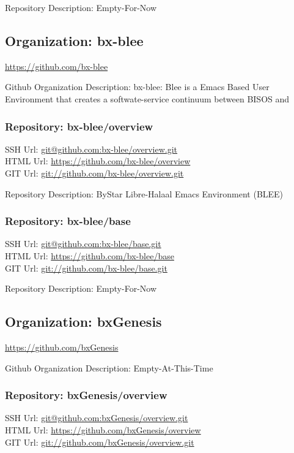 Repository Description: Empty-For-Now

\subsection{Organization: bx-blee}

\url{https://github.com/bx-blee}

Github Organization Description:  bx-blee: Blee is a Emacs Based User Environment that creates a softwate-service continuum between BISOS and 

\subsubsection{Repository: bx-blee/overview}

SSH Url:  \url{git@github.com:bx-blee/overview.git}\\
HTML Url: \url{https://github.com/bx-blee/overview}\\
GIT Url:  \url{git://github.com/bx-blee/overview.git}

Repository Description: ByStar Libre-Halaal Emacs Environment (BLEE)

\subsubsection{Repository: bx-blee/base}

SSH Url:  \url{git@github.com:bx-blee/base.git}\\
HTML Url: \url{https://github.com/bx-blee/base}\\
GIT Url:  \url{git://github.com/bx-blee/base.git}

Repository Description: Empty-For-Now

\subsection{Organization: bxGenesis}

\url{https://github.com/bxGenesis}

Github Organization Description: Empty-At-This-Time

\subsubsection{Repository: bxGenesis/overview}

SSH Url:  \url{git@github.com:bxGenesis/overview.git}\\
HTML Url: \url{https://github.com/bxGenesis/overview}\\
GIT Url:  \url{git://github.com/bxGenesis/overview.git}

